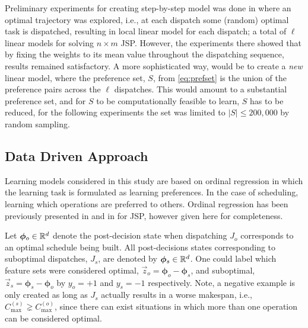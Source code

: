 \documentclass[smallextended]{svjour3}
\renewcommand{\vphi}{\bm \phi}
\begin{document}
	Preliminary experiments for creating step-by-step model was done in \cite{InRu11a} where an optimal trajectory was explored, i.e., at each dispatch some (random) optimal task is dispatched, resulting in local linear model for each dispatch; a total of $\ell$ linear models for solving $n\times m$ JSP. However, the experiments there showed that by fixing the weights to its mean value throughout the dispatching sequence, results remained satisfactory.  
	A more sophisticated way, would be to create a \emph{new} linear model, where the preference set, $S$, from \cref{eq:prefset} is the union of the preference pairs across the $\ell$ dispatches. 
	This would amount to a substantial preference set, and for $S$ to be computationally feasible to learn, $S$ has to be reduced, for the following experiments the set was limited to $|S|\leq200,000$ by random sampling. 
	

	\subsection{Data Driven Approach}\label{sec:datadriven}	
	Learning models considered in this study are based on ordinal regression in which the learning task is formulated as learning preferences. In the case of scheduling, learning which operations are preferred to others. Ordinal regression has been previously presented in \cite{Ru06:PPSN} and in \cite{InRu11a} for JSP, however given here for completeness. 
	
	Let $\vphi_{o}\in\R^d$ denote the post-decision state when dispatching $J_o$ corresponds to an optimal schedule being built. All post-decisions states corresponding to suboptimal dispatches, $J_s$, are denoted by $\vphi_{s}\in\R^d$. One could label which feature sets were considered optimal, $\vec{z}_{o}=\vphi_{o}-\vphi_{s}$, and suboptimal, $\vec{z}_{s}=\vphi_{s}-\vphi_{o}$ by $y_o=+1$ and $y_s=-1$ respectively. 
	Note, a negative example is only created as long as $J_s$ actually results in a worse makespan, i.e., $C_{\max}^{(s)}\gneq C_{\max}^{(o)}$, since there can exist situations in which more than one operation can be considered optimal. 
	
\end{document}
